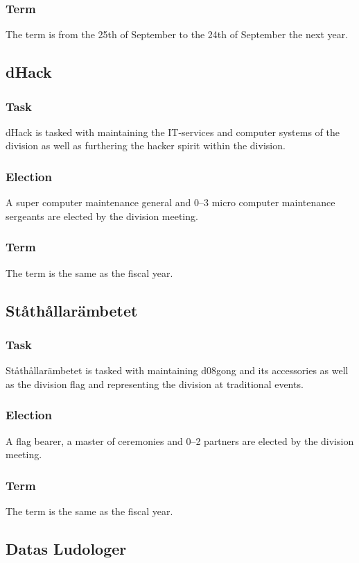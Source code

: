 \subsubsection{Term}
The term is from the 25th of September to the 24th of September the next year. 

\subsection{dHack}
\subsubsection{Task}
dHack is tasked with maintaining the IT-services and computer systems of the division as well as furthering the hacker spirit within the division. 
\subsubsection{Election}
A super computer maintenance general and 0--3 micro computer maintenance sergeants are elected by the division meeting.
\subsubsection{Term}
The term is the same as the fiscal year. 

\subsection{Ståthållarämbetet}
\subsubsection{Task}
Ståthållarämbetet is tasked with maintaining d08gong and its accessories as well as the division flag and representing the division at traditional events. 
\subsubsection{Election}
A flag bearer, a master of ceremonies and 0--2 partners are elected by the division meeting. 
\subsubsection{Term}
The term is the same as the fiscal year. 

\subsection{Datas Ludologer}
